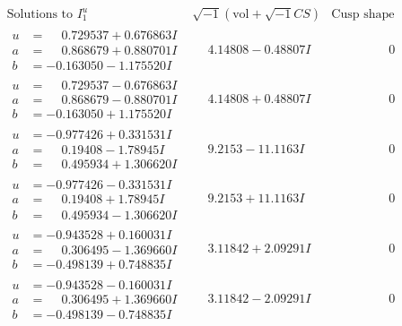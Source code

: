 \documentclass[1p]{elsarticle_modified}
\theoremstyle{definition}
\newcommand{\I}{\sqrt{-1}}
\begin{document}
$$\begin{array}{c|c|c}  
\text{Solutions to }I^u_{1}& \I (\text{vol} + \sqrt{-1}CS) & \text{Cusp shape}\\
 \hline 
\begin{aligned}
u &= \phantom{-}0.729537 + 0.676863 I \\
a &= \phantom{-}0.868679 + 0.880701 I \\
b &= -0.163050 - 1.175520 I\end{aligned}
 & \phantom{-}4.14808 - 0.48807 I & \phantom{-0.000000 } 0 \\ \hline\begin{aligned}
u &= \phantom{-}0.729537 - 0.676863 I \\
a &= \phantom{-}0.868679 - 0.880701 I \\
b &= -0.163050 + 1.175520 I\end{aligned}
 & \phantom{-}4.14808 + 0.48807 I & \phantom{-0.000000 } 0 \\ \hline\begin{aligned}
u &= -0.977426 + 0.331531 I \\
a &= \phantom{-}0.19408 - 1.78945 I \\
b &= \phantom{-}0.495934 + 1.306620 I\end{aligned}
 & \phantom{-}9.2153 - 11.1163 I & \phantom{-0.000000 } 0 \\ \hline\begin{aligned}
u &= -0.977426 - 0.331531 I \\
a &= \phantom{-}0.19408 + 1.78945 I \\
b &= \phantom{-}0.495934 - 1.306620 I\end{aligned}
 & \phantom{-}9.2153 + 11.1163 I & \phantom{-0.000000 } 0 \\ \hline\begin{aligned}
u &= -0.943528 + 0.160031 I \\
a &= \phantom{-}0.306495 - 1.369660 I \\
b &= -0.498139 + 0.748835 I\end{aligned}
 & \phantom{-}3.11842 + 2.09291 I & \phantom{-0.000000 } 0 \\ \hline\begin{aligned}
u &= -0.943528 - 0.160031 I \\
a &= \phantom{-}0.306495 + 1.369660 I \\
b &= -0.498139 - 0.748835 I\end{aligned}
 & \phantom{-}3.11842 - 2.09291 I & \phantom{-0.000000 } 0 \\ \hline\begin{aligned}

\end{aligned}
\end{array}$$
\end{document}
